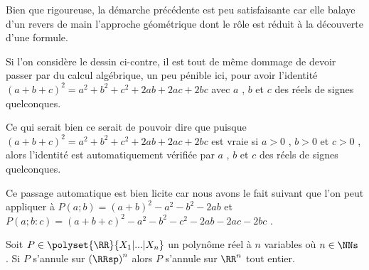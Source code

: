 Bien que rigoureuse, la démarche précédente est peu satisfaisante car elle balaye d'un revers de main l'approche géométrique dont le rôle est réduit à la découverte d'une formule.


\medskip

Si l'on considère le dessin ci-contre, il est tout de même dommage de devoir passer par du calcul algébrique, un peu pénible ici, pour avoir l'identité $(a + b + c)^2 = a^2 + b^2 + c^2 + 2 ab + 2 ac + 2 bc$ avec $a$ , $b$ et $c$ des réels de signes quelconques.


\medskip

Ce qui serait bien ce serait de pouvoir dire que puisque $(a + b + c)^2 = a^2 + b^2 + c^2 + 2 ab + 2 ac + 2 bc$ est vraie si $a > 0$ , $b > 0$ et $c > 0$ , alors l'identité est automatiquement vérifiée par $a$ , $b$ et $c$ des réels de signes quelconques.




\medskip

Ce passage automatique est bien licite car nous avons le fait suivant que l'on peut appliquer à $P(a ; b) = (a + b)^2 - a^2 - b^2 - 2 ab$ et $P(a ; b : c) = (a + b + c)^2 - a^2 - b^2 - c^2 - 2 ab - 2 ac - 2 bc$ .

\begin{fact*}
	Soit $P \in \polyset{\RR}{X_1 | ... | X_n}$ un polynôme réel à $n$ variables où $n \in \NNs$ .
	Si $P$ s'annule sur $\left( \RRsp \right)^n$ alors $P$ s'annule sur $\RR^n$ tout entier. 
\end{fact*}


